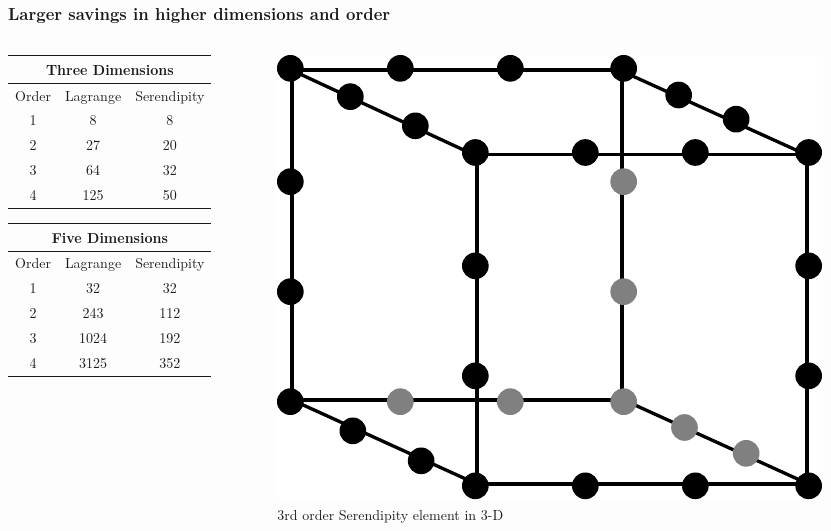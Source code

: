 \documentclass[serif,12pt]{beamer}
\begin{document}
\begin{frame}
\frametitle{Larger savings in higher dimensions and order}
\begin{columns}
	\begin{column}{0.5\linewidth}
		\begin{tabular}{c|cc}
			\multicolumn{3}{c}{{\bf Three Dimensions}} \\
			\hline
			Order & Lagrange & Serendipity \\
			\hline
			1 & 8 & 8 \\
			2 & 27 & 20 \\
			3 & 64 & 32 \\
			4 & 125 & 50
		\end{tabular}
		\begin{tabular}{c|cc}
			\multicolumn{3}{c}{{\bf Five Dimensions}} \\
			\hline
			Order & Lagrange & Serendipity \\
			\hline
			1 & 32 & 32 \\
			2 & 243 & 112 \\
			3 & 1024 & 192 \\
			4 & 3125 & 352
		\end{tabular}
	\end{column}

	\begin{column}{0.4\linewidth}
		\begin{figure}
			\includegraphics[width=.8\textwidth]{figures/r3d3.pdf}
		    \caption{3rd order Serendipity element in 3-D}
		\end{figure}
	\end{column}
\end{columns}
\end{frame}
\end{document}
